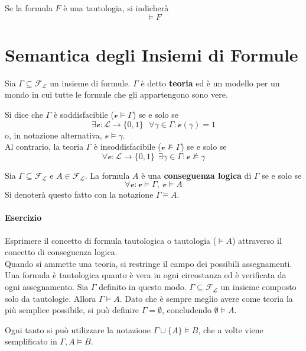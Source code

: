 \begin{defi}[Tautologia]
Se la formula $F$ è una tautologia, si indicherà 
$$
\models F
$$
\end{defi}


\section{Semantica degli Insiemi di Formule}
\begin{defi}[Teoria]
Sia $\Gamma \subseteq \mathscr{F_L}$ un insieme di formule. $\Gamma$ è detto 
\textbf{teoria} ed è un modello per un mondo in cui tutte le formule che 
gli appartengono sono vere.
\end{defi}
Si dice che $\Gamma$ è soddisfacibile ($\mathcal{v} \models \Gamma$) se e solo se  
$$
\exists \mathcal{v}: \mathscr{L} \rightarrow \{0,1\} ~~~ \forall \gamma \in \Gamma:\mathcal{v}(\gamma) = 1
$$
o, in notazione alternativa, $\mathcal{v} \models \gamma$. \\
Al contrario, la teoria $\Gamma$ è insoddisfacibile ($\mathcal{v} \nvDash \Gamma$) se e solo se 
$$
\forall \mathcal{v}: \mathscr{L} \rightarrow \{0,1\} ~~ \exists \gamma \in \Gamma : \mathcal{v} \nvDash \gamma
$$

\begin{defi}
Sia $\Gamma \subseteq \mathscr{F_L}$ e $A \in \mathscr{F_L}$. La formula $A$ è una 
\textbf{conseguenza logica} di $\Gamma$ se e solo se 
$$
\forall \mathcal{v} : \mathcal{v} \models\Gamma,\ \mathcal{v} \models A
$$ 
Si denoterà questo fatto con la notazione $\Gamma \models A$.
\end{defi}

\paragraph{Esercizio} 
Esprimere il concetto di formula tautologica o tautologia ($\models A$)
attraverso il concetto di conseguenza logica. \\
Quando si ammette una teoria, si restringe il campo dei possibili assegnamenti. 
Una formula è tautologica quanto è vera in ogni circostanza ed è verificata 
da ogni assegnamento. Sia $\Gamma$ definito in questo modo. $\Gamma \subseteq \mathscr{F_L}$ 
un insieme composto solo da tautologie. Allora 
$\Gamma \models A$. Dato che è sempre meglio avere come teoria la più semplice 
possibile, si può definire $\Gamma = \emptyset$, concludendo $\emptyset \models A$. 

\noindent
Ogni tanto si può utilizzare la notazione $\Gamma \cup \{A\} \models B$, che 
a volte viene semplificato in $\Gamma,A \models B$. 

